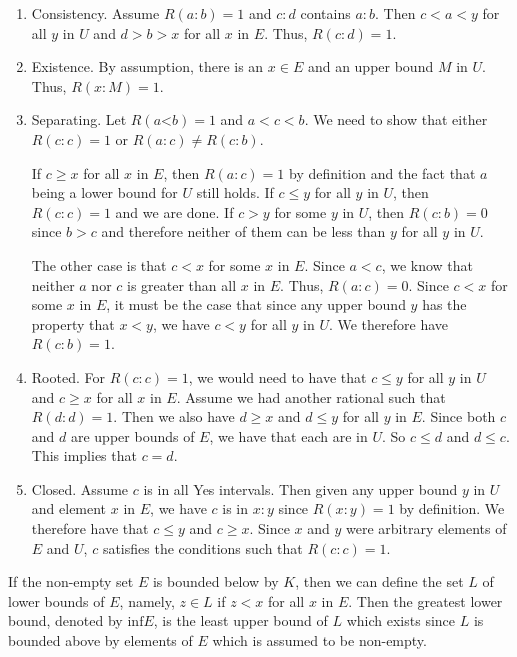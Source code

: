 \documentclass[12pt]{article}
\theoremstyle{remark}
\newcommand{\lt}{\mathord{<}}
\begin{document}
\begin{enumerate}
    \item Consistency. Assume $R(a:b)=1$ and $c:d$ contains $a:b$. Then $c < a < y$ for all $y$ in $U$ and $d > b > x$ for all $x$ in $E$. Thus, $R(c:d) = 1$.
    \item Existence. By assumption, there is an $x \in E$ and an upper bound $M$ in $U$. Thus, $R(x:M) = 1$. 
    \item Separating. Let $R(a\lt b)=1$ and $a < c< b$. We need to show that either $R(c:c)=1$ or $R(a:c) \neq R(c:b)$. 
    
    If $c \geq x$ for all $x$ in $E$, then $R(a:c)=1$ by definition and the fact that $a$ being a lower bound for $U$ still holds. If $c \leq y$ for all $y$ in $U$, then $R(c:c)=1$ and we are done. If $c > y$ for some $y$ in $U$, then $R(c:b) = 0$ since $b > c$ and therefore neither of them can be less than $y$ for all $y$ in $U$. 
    
    The other case is that $c < x$ for some $x$ in $E$. Since $a < c$, we know that neither $a$ nor $c$ is greater than all $x$ in $E$. Thus, $R(a:c) = 0$. Since $c < x$ for some $x$ in $E$, it must be the case that since any upper bound $y$ has the property that $x < y$, we have $c < y$ for all $y$ in $U$. We therefore have $R(c:b)=1$.
    
    \item Rooted. For $R(c:c)=1$, we would need to have that $c \leq y$ for all $y$ in $U$ and $c \geq x$ for all $x$ in $E$. Assume we had another rational such that $R(d:d) = 1$. Then we also have $d \geq x$ and $d \leq y$ for all $y$ in $E$. Since both $c$ and $d$ are upper bounds of $E$, we have that each are in $U$. So $c \leq d$ and $d \leq c$. This implies that $c = d$. 
    \item Closed. Assume $c$ is in all Yes intervals. Then given any upper bound $y$ in $U$ and element $x$ in $E$, we have $c$ is in $x:y$ since $R(x:y)=1$ by definition. We therefore have that $c \leq y$ and $c \geq x$. Since $x$ and $y$ were arbitrary elements of $E$ and $U$, $c$ satisfies the conditions such that $R(c:c)=1$.
\end{enumerate}

If the non-empty set $E$ is bounded below by $K$, then we can define the set $L$ of lower bounds of $E$, namely, $z \in L$ if $z < x$ for all $x$ in $E$. Then the greatest lower bound, denoted by $\mathrm{inf} E$, is the least upper bound of $L$ which exists since $L$ is bounded above by elements of $E$ which is assumed to be non-empty. 
\end{document}
